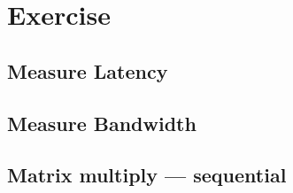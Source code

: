 \documentclass[]{scrartcl}
\newcommand{\exercise}{Exercise \thesection}
\begin{document}
\section*{\exercise}

\subsection{Measure Latency}
\subsection{Measure Bandwidth}
\subsection{Matrix multiply --- sequential}
\end{document}
